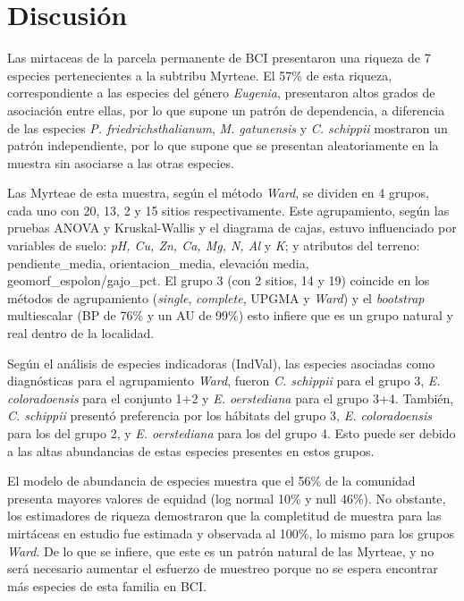 \documentclass[11pt,]{article}
\begin{document}
\section{Discusión}\label{discusiuxf3n}

Las mirtaceas de la parcela permanente de BCI presentaron una riqueza de
7 especies pertenecientes a la subtribu Myrteae. El 57\% de esta
riqueza, correspondiente a las especies del género \emph{Eugenia},
presentaron altos grados de asociación entre ellas, por lo que supone un
patrón de dependencia, a diferencia de las especies \emph{P.
friedrichsthalianum}, \emph{M. gatunensis} y \emph{C. schippii}
mostraron un patrón independiente, por lo que supone que se presentan
aleatoriamente en la muestra sin asociarse a las otras especies.

Las Myrteae de esta muestra, según el método \emph{Ward}, se dividen en
4 grupos, cada uno con 20, 13, 2 y 15 sitios respectivamente. Este
agrupamiento, según las pruebas ANOVA y Kruskal-Wallis y el diagrama de
cajas, estuvo influenciado por variables de suelo: \emph{pH, Cu, Zn, Ca,
Mg, N, Al} y \emph{K}; y atributos del terreno: pendiente\_media,
orientacion\_media, elevación media, geomorf\_espolon/gajo\_pct. El
grupo 3 (con 2 sitios, 14 y 19) coincide en los métodos de agrupamiento
(\emph{single}, \emph{complete}, UPGMA y \emph{Ward}) y el
\emph{bootstrap} multiescalar (BP de 76\% y un AU de 99\%) esto infiere
que es un grupo natural y real dentro de la localidad.

Según el análisis de especies indicadoras (IndVal), las especies
asociadas como diagnósticas para el agrupamiento \emph{Ward}, fueron
\emph{C. schippii} para el grupo 3, \emph{E. coloradoensis} para el
conjunto 1+2 y \emph{E. oerstediana} para el grupo 3+4. También,
\emph{C. schippii} presentó preferencia por los hábitats del grupo 3,
\emph{E. coloradoensis} para los del grupo 2, y \emph{E. oerstediana}
para los del grupo 4. Esto puede ser debido a las altas abundancias de
estas especies presentes en estos grupos.

El modelo de abundancia de especies muestra que el 56\% de la comunidad
presenta mayores valores de equidad (log normal 10\% y null 46\%). No
obstante, los estimadores de riqueza demostraron que la completitud de
muestra para las mirtáceas en estudio fue estimada y observada al 100\%,
lo mismo para los grupos \emph{Ward}. De lo que se infiere, que este es
un patrón natural de las Myrteae, y no será necesario aumentar el
esfuerzo de muestreo porque no se espera encontrar más especies de esta
familia en BCI.
\end{document}
